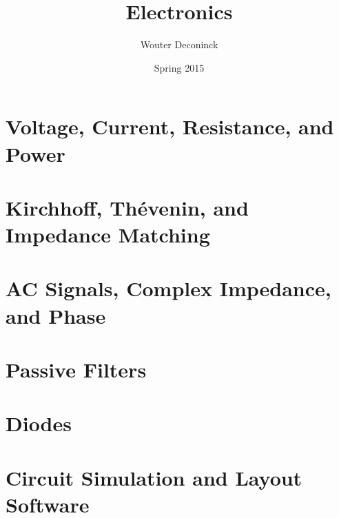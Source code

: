 \documentclass{book}
\title{Electronics}
\date{Spring 2015}
\author{Wouter Deconinck}
\begin{document}
\maketitle



\tableofcontents

\chapter{Voltage, Current, Resistance, and Power}
%
\graphicspath{{lab01/}}



\chapter{Kirchhoff, Th\'{e}venin, and Impedance Matching}
%
\graphicspath{{lab02/}}



\chapter{AC Signals, Complex Impedance, and Phase}
%
\graphicspath{{lab03/}}



\chapter{Passive Filters}
%
\graphicspath{{lab04/}}



\chapter{Diodes}
%
\graphicspath{{lab05/}}



\chapter{Circuit Simulation and Layout Software}
%
\graphicspath{{lab06/}}


\end{document}
